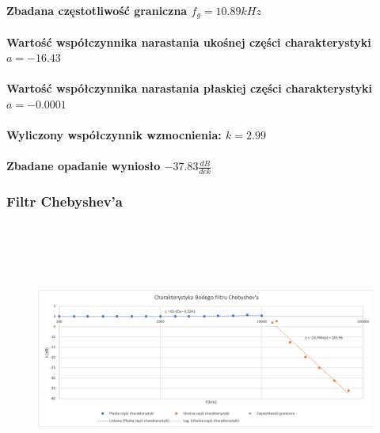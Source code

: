 \documentclass[a4paper,12pt]{article}
\begin{document}
\begin{justify}
\paragraph{Zbadana częstotliwość graniczna $f_{g} = 10.89kHz$}

\paragraph{Wartość współczynnika narastania ukośnej części charakterystyki $a = -16.43$}
\paragraph{Wartość współczynnika narastania płaskiej części charakterystyki $a = -0.0001$}

\paragraph{Wyliczony współczynnik wzmocnienia: $k = 2.99$}

\paragraph{Zbadane opadanie wyniosło $-37.83 \frac{dB}{dek}$}

\newpage

\subsubsection{Filtr Chebyshev'a}

\begin{figure}[h]
\centering
\includegraphics[width=15cm, height=9cm]{4_wykr_chebyshev}
\end{figure}


\end{justify}
\end{document}
